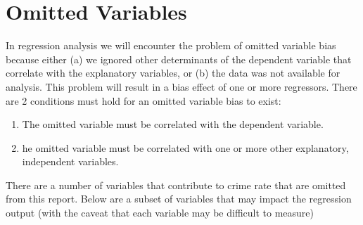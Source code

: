 \pagebreak

\section{Omitted Variables}
\label{sec:OmittedVariables}

In regression analysis we will encounter the problem of omitted variable bias because either (a) we ignored other determinants of the dependent variable that correlate with the explanatory variables, or (b) the data was not available for analysis. This problem will result in a bias effect of one or more regressors. There are 2 conditions must hold for an omitted variable bias to exist:\\

\begin{enumerate}
	\item The omitted variable must be correlated with the dependent variable.
	\item he omitted variable must be correlated with one or more other explanatory, independent variables. 
\end{enumerate}

There are a number of variables that contribute to crime rate that are omitted from this report. Below are a subset of variables that may impact the regression output (with the caveat that each variable may be difficult to measure)\\

